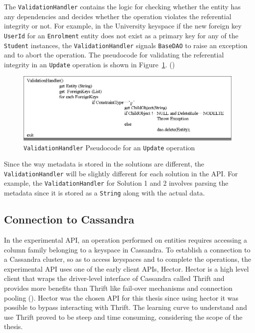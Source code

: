 		The	\texttt{ValidationHandler} contains the logic for checking whether the entity
		has any dependencies and decides whether the operation violates the
		referential integrity or not.  For example, in the University keyspace if the
		new foreign key \texttt{UserId} for an \texttt{Enrolment} entity does not
		exist as a primary key for any of the \texttt{Student} instances,  the
		\texttt{ValidationHandler} signals \texttt{BaseDAO} to raise an exception and
		to abort the operation.  The	pseudocode for validating the referential
		integrity in an \texttt{Update} operation is shown in
		Figure~\ref{f:VHpseudocode}. 
		() \begin{figure}[h]
			\centering
			\includegraphics[width=.8\textwidth]{./figure/Solutions/VH-UpdatePseudocode.png}
			\caption{\texttt{ValidationHandler} Pseudocode for an
			\texttt{Update} operation}\label{f:VHpseudocode}
		\end{figure}
		
		Since the way metadata is stored in the solutions are different, the
		\texttt{ValidationHandler} will be slightly different for each solution in the
		\ac{API}.  For example, the \texttt{ValidationHandler} for Solution 1 and 2
		involves parsing the metadata since it is stored as a
		\texttt{String} along with the actual data. 
		
		\subsection{Connection to Cassandra}
		In the experimental \ac{API}, an operation  performed on entities requires
		accessing a column family belonging to a keyspace in Cassandra.  To establish a
		connection to a Cassandra cluster, so as to access keyspaces and to complete
		the operations, the experimental \ac{API} uses one of the early client \acp{API}, Hector.  Hector is a high level client that wraps the driver-level interface of Cassandra called Thrift
		and provides more benefits than Thrift like fail-over mechanisms and
		connection pooling ().  Hector was the chosen \ac{API} for this thesis
		since using hector it was possible to bypass interacting with Thrift.  The
		learning curve to understand and use Thrift proved to be steep and time
		consuming, considering the scope of the thesis. 
		
